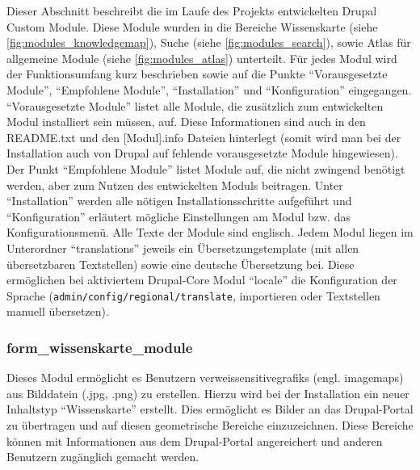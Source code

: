 Dieser Abschnitt beschreibt die im Laufe des Projekts entwickelten Drupal Custom Module. Diese Module wurden in die Bereiche Wissenskarte (siehe \cref{fig:modules_knowledgemap}), Suche (siehe \cref{fig:modules_search}), sowie Atlas für allgemeine Module (siehe \cref{fig:modules_atlas}) unterteilt.
Für jedes Modul wird der Funktionsumfang kurz beschrieben sowie auf die Punkte \enquote{Vorausgesetzte Module}, \enquote{Empfohlene Module}, \enquote{Installation} und \enquote{Konfiguration} eingegangen. \enquote{Vorausgesetzte Module} listet alle Module, die zusätzlich zum entwickelten Modul installiert sein müssen, auf. Diese Informationen sind auch in den README.txt und den [Modul].info Dateien hinterlegt (somit wird man bei der Installation auch von Drupal auf fehlende vorausgesetzte Module hingewiesen). Der Punkt \enquote{Empfohlene Module} listet Module auf, die nicht zwingend benötigt werden, aber zum Nutzen des entwickelten Moduls beitragen. Unter \enquote{Installation} werden alle nötigen Installationsschritte aufgeführt und \enquote{Konfiguration} erläutert mögliche Einstellungen am Modul bzw. das Konfigurationsmenü. Alle Texte der Module sind englisch. Jedem Modul liegen im Unterordner \enquote{translations} jeweils ein Übersetzungstemplate (mit allen übersetzbaren Textstellen) sowie eine deutsche Übersetzung bei. Diese ermöglichen bei aktiviertem Drupal-Core Modul \enquote{locale} die Konfiguration der Sprache (\lstinline|admin/config/regional/translate|, importieren oder Textstellen manuell übersetzen).






\newpage
\subsubsection{form\_wissenskarte\_module}\label{subsub:form_wissenskarte_module}
Dieses Modul ermöglicht es Benutzern \glspl{verweissensitivegrafik} (engl. \glspl{imagemap}) aus Bilddatein (.jpg, .png) zu erstellen. Hierzu wird bei der Installation ein neuer Inhaltstyp \enquote{Wissenskarte} erstellt. Dies ermöglicht es Bilder an das Drupal-Portal zu übertragen und auf diesen geometrische Bereiche einzuzeichnen. Diese Bereiche können mit Informationen aus dem Drupal-Portal angereichert und anderen Benutzern zugänglich gemacht werden.

